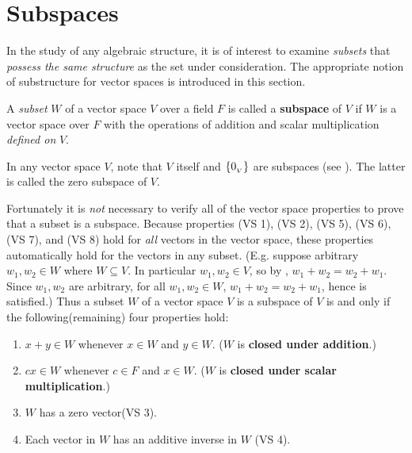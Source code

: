 \section{Subspaces} \label{sec 1.3}

In the study of any algebraic structure, it is of interest to examine \emph{subsets} that \emph{possess the same structure} as the set under consideration.
The appropriate notion of substructure for vector spaces is introduced in this section.

\begin{definition} \label{def 1.2}
A \emph{subset} \(W\) of a vector space \(V\) over a field \(F\) is called a \textbf{subspace} of \(V\) if \(W\) is a vector space over \(F\) with the operations of addition and scalar multiplication \emph{defined on} \(V\).
\end{definition}

\begin{note}
In any vector space \(V\), note that \(V\) itself and \(\{ 0_{_V} \}\) are subspaces (see ).
The latter is called the zero subspace of \(V\).
\end{note}

Fortunately it is \emph{not} necessary to verify all of the vector space properties to prove that a subset is a subspace.
Because properties  (VS 1), (VS 2), (VS 5), (VS 6), (VS 7), and (VS 8) hold for \emph{all} vectors in the vector space, these properties automatically hold for the vectors in any subset.
(E.g. suppose arbitrary \(w_1, w_2 \in W\) where \(W \subseteq V\).
In particular \(w_1, w_2 \in V\), so by , \(w_1 + w_2 = w_2 + w_1\).
Since \(w_1, w_2\) are arbitrary, for all \(w_1, w_2 \in W\), \(w_1 + w_2 = w_2 + w_1\), hence  is satisfied.)
Thus a subset \(W\) of a vector space \(V\) is a subspace of \(V\) is and only if the following(remaining) four properties hold:
\begin{enumerate} \label{discussion of thm 1.3}
    \item \(x + y \in W\) whenever \(x \in W\) and \(y \in W\). (\(W\) is \textbf{closed under addition}.)
    \item \(cx \in W\) whenever \(c \in F\) and \(x \in W\). (\(W\) is \textbf{closed under scalar multiplication}.)
    \item \(W\) has a zero vector(VS 3).
    \item Each vector in \(W\) has an additive inverse in \(W\) (VS 4).
\end{enumerate}

